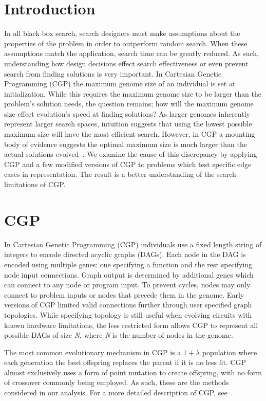 \documentclass{sig-alternate}
\begin{document}
\section{Introduction}
In all black box search, search designers must make assumptions about the properties
of the problem in order to outperform random search.  When these assumptions
match the application, search time can be greatly reduced.  As such, understanding how design decisions
effect search effectiveness or even prevent search from finding solutions is very important.
%
In Cartesian Genetic Programming (CGP) the maximum genome size of an individual
is set at initialization.  While this
requires the maximum genome size to be larger than the problem's solution needs,
the question remains; how will the maximum genome size effect evolution's
speed at finding solutions?  As larger genomes inherently represent larger search
spaces, intuition suggests that using the lowest possible maximum size will have the most efficient search.
However, in CGP a mounting body of evidence suggests the optimal
maximum size is much larger than the actual solutions evolved~\cite{miller:2006:redundancy}.
We examine the cause of this discrepancy by applying CGP and a few
modified versions of CGP to problems which test specific edge cases in representation.
The result is a better understanding of the search limitations of CGP.

\section{CGP}
\label{sec-cgp}
In Cartesian Genetic Programming (CGP) individuals use a fixed length string of integers to
encode directed acyclic graphs (DAGs).  
Each node in the DAG is encoded using multiple genes: one specifying a function and
the rest specifying node input connections.
Graph output is determined by additional genes which can connect to any node or
program input.
To prevent cycles,
nodes may only connect to problem inputs or nodes that precede them in the genome.
Early versions of CGP limited valid connections further through user specified graph
topologies.
While specifying topology is still useful
when evolving circuits with known hardware limitations, the less restricted form
allows CGP to represent all possible
DAGs of size \emph{N}, where \emph{N} is the number of nodes in the genome.

%
The most common evolutionary mechanism in CGP is a $1+\lambda$ population
where each generation the best offspring replaces the parent if it is no less
fit.  CGP almost exclusively uses a form of point mutation to create offspring,
with no form of crossover commonly being employed.  As such, these are the methods
considered in our analysis.
For a more detailed description of CGP, see~\cite{miller:2011:chapter2}.
\end{document}

